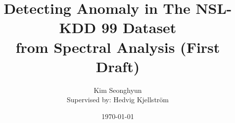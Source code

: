 \title{Detecting Anomaly in The NSL-KDD 99 Dataset \\ from Spectral Analysis (First Draft)}

\author{Kim Seonghyun \\{\small Supervised by: Hedvig Kjellstr\"{o}m}}

\date{\today}
